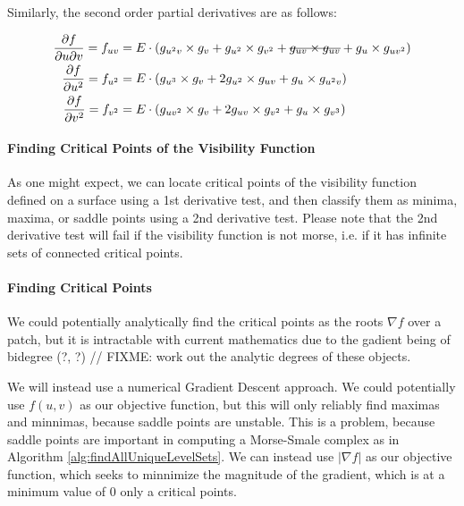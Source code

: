 \documentclass[12pt, letterpaper]{article}
\begin{document}
			Similarly, the second order partial derivatives are as follows:

			\begin{align*}
			\frac{\partial f}{\partial u \partial v} = f_{uv} &= E \cdot (g_{u^{2}v} \times g_{v} + g_{u^{2}} \times g_{v^{2}} + \text{\sout{\ensuremath{g_{uv} \times g_{uv}}}} + g_{u} \times g_{uv^{2}})\\
			\frac{\partial f}{\partial u^{2}} = f_{u^{2}}  &= E \cdot (g_{u^{3}} \times g_{v} + 2g_{u^{2}} \times g_{uv} + g_{u} \times g_{u^{2}v})\\
			\frac{\partial f}{\partial v^{2}} = f_{v^{2}}  &= E \cdot (g_{uv^{2}} \times g_{v} + 2g_{uv} \times g_{v^{2}} + g_{u} \times g_{v^{3}})\\
			\end{align*}

		\paragraph{Finding Critical Points of the Visibility Function}

		As one might expect, we can locate critical points of the visibility function defined on a surface using a 1st derivative test,
		and then classify them as minima, maxima, or saddle points using a 2nd derivative test. Please note that the 2nd derivative test will 
		fail if the visibility function is not morse, i.e. if it has infinite sets of connected critical points.

		\paragraph{Finding Critical Points}

		We could potentially analytically find the critical points as the roots $\nabla f$ over a patch, but it is intractable with current mathematics due
		to the gadient being of bidegree (?, ?) // FIXME: work out the analytic degrees of these objects.

		We will instead use a numerical Gradient Descent approach. We could potentially use $f(u, v)$ as our objective function, but this will only reliably 
		find maximas and minnimas, because saddle points are unstable. This is a problem, because saddle points are important in computing a Morse-Smale complex
		as in Algorithm \ref{alg:findAllUniqueLevelSets}. We can instead use $|\nabla f|$ as our objective function,
		which seeks to minnimize the magnitude of the gradient, which is at a minimum value of 0 only a critical points.
	
\end{document}
